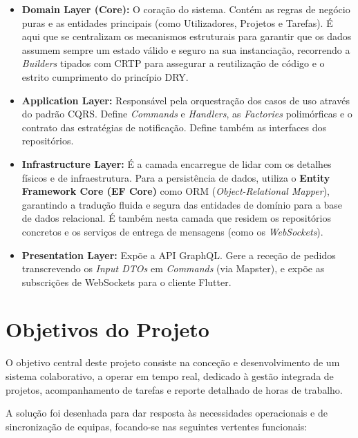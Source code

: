\documentclass{llncs}
\begin{document}
\begin{itemize}
    \item \textbf{Domain Layer (Core):} O coração do sistema. Contém as regras de negócio puras e as entidades principais (como Utilizadores, Projetos e Tarefas). É aqui que se centralizam os mecanismos estruturais para garantir que os dados assumem sempre um estado válido e seguro na sua instanciação, recorrendo a \textit{Builders} tipados com CRTP para assegurar a reutilização de código e o estrito cumprimento do princípio DRY.
    \item \textbf{Application Layer:} Responsável pela orquestração dos casos de uso através do padrão CQRS. Define \textit{Commands} e \textit{Handlers}, as \textit{Factories} polimórficas e o contrato das estratégias de notificação. Define também as interfaces dos repositórios.
\item \textbf{Infrastructure Layer:} É a camada encarregue de lidar com os detalhes físicos e de infraestrutura. Para a persistência de dados, utiliza o \textbf{Entity Framework Core (EF Core)} como ORM (\textit{Object-Relational Mapper}), garantindo a tradução fluida e segura das entidades de domínio para a base de dados relacional. É também nesta camada que residem os repositórios concretos e os serviços de entrega de mensagens (como os \textit{WebSockets}).
    \item \textbf{Presentation Layer:} Expõe a API GraphQL. Gere a receção de pedidos transcrevendo os \textit{Input DTOs} em \textit{Commands} (via Mapster), e expõe as subscrições de WebSockets para o cliente Flutter.
\end{itemize}

\newpage

\section{Objetivos do Projeto}
O objetivo central deste projeto consiste na conceção e desenvolvimento de um sistema colaborativo, a operar em tempo real, dedicado à gestão integrada de projetos, acompanhamento de tarefas e reporte detalhado de horas de trabalho.

A solução foi desenhada para dar resposta às necessidades operacionais e de sincronização de equipas, focando-se nas seguintes vertentes funcionais:
\end{document}
